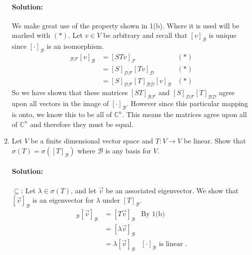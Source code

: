 \documentclass{article}
\begin{document}
\begin{enumerate}
      \paragraph{Solution: }%
      We make great use of the property shown in 1(b). Where it is used will be marked with $(*)$. Let $v\in V$ be arbitrary and recall that $[v]_{\mathcal{B}}$ is unique since $[\cdot ]_\mathcal{B}$ is an isomorphism. 
      \begin{align*}
          [ST]_{\mathcal{B}\mathcal{F}}[v]_\mathcal{B}&= [STv]_\mathcal{F}&(*) \\
                                              &= [S]_{\mathcal{D}\mathcal{F}}[Tv]_{\mathcal{D}}&(*) \\
                                              &= [S]_{\mathcal{D}\mathcal{F}}[T]_{\mathcal{B}\mathcal{D}}[v]_\mathcal{B}&(*) 
      \end{align*}
      So we have shown that these matrices $[ST]_{\mathcal{B}\mathcal{F}}$ and  $[S]_{\mathcal{DF}}[T]_{\mathcal{B}\mathcal{D}} $ agree upon all vectors in the image of $[\cdot ]_\mathcal{B}$. However since this particular mapping is onto, we know this to be all of  $\mathbb{C}^{n}$. This means the matrices agree upon all of $\mathbb{C}^{n}$ and therefore they must be equal. 
  \item Let $V$ be a finite dimensional vector space and $T : V \to V$ be linear. Show that $\sigma(T)=\sigma([T]_{\mathcal{B}})$ where $\mathcal{B}$ is any basis for $V$.
    \paragraph{Solution:} $\subseteq $: Let $ \lambda\in \sigma(T)$, and let $\vec{v}$ be an associated eigenvector. We show that $[\vec{v}]_\mathcal{B}$ is an eigenvector for $\lambda$ under $[T]_\mathcal{B}$.
    \begin{align*}
        [T]_\mathcal{B}[\vec{v}]_\mathcal{B}&= [T\vec{v}]_\mathcal{B}&\text{By 1(b)} \\
                                            &= [\lambda \vec{v}]_\mathcal{B} \\
                                            &= \lambda[ \vec{v}]_\mathcal{B} &[\cdot ]_\mathcal{B}\text{ is linear }
    .\end{align*}


\end{enumerate}
\end{document}
